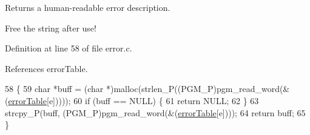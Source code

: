 Returns a human-\/readable error description. 

Free the string after use! 

Definition at line 58 of file error.\-c.



References error\-Table.


\begin{DoxyCode}
58                               \{
59     \textcolor{keywordtype}{char} *buff = (\textcolor{keywordtype}{char} *)malloc(strlen\_P((PGM\_P)pgm\_read\_word(&(\hyperlink{error_8c_a0bb6d2621c3b908d06e6b1343f5a3873}{errorTable}[e]))));
60     \textcolor{keywordflow}{if} (buff == NULL) \{
61         \textcolor{keywordflow}{return} NULL;
62     \}
63     strcpy\_P(buff, (PGM\_P)pgm\_read\_word(&(\hyperlink{error_8c_a0bb6d2621c3b908d06e6b1343f5a3873}{errorTable}[e])));
64     \textcolor{keywordflow}{return} buff;
65 \}
\end{DoxyCode}
